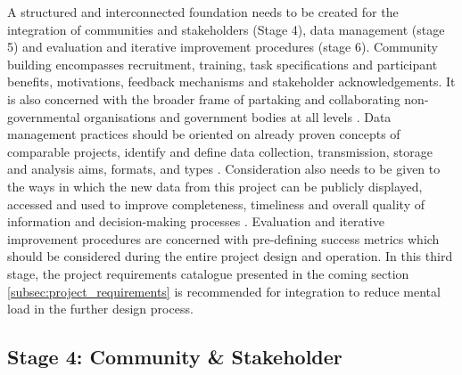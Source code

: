 A structured and interconnected foundation needs to be created for the integration of communities and stakeholders (Stage 4), data management (stage 5) and evaluation and iterative improvement procedures (stage 6). Community building encompasses recruitment, training, task specifications and participant benefits, motivations, feedback mechanisms and stakeholder acknowledgements. It is also concerned with the broader frame of partaking and collaborating non-governmental organisations and government bodies at all levels \autocite{conradReviewCitizenScience2011}. Data management practices should be oriented on already proven concepts of comparable projects, identify and define data collection, transmission, storage and analysis aims, formats, and types \autocite{fraislCitizenScienceEnvironmental2022,gualazziniEWEAEarlyWarning2021,ifrcCommunityBasedSurveillanceGuiding2017}. Consideration also needs to be given to the ways in which the new data from this project can be publicly displayed, accessed and used to improve completeness, timeliness and overall quality of information and decision-making processes \autocite{conradMeaningfulCommunityBasedEcological2006}. Evaluation and iterative improvement procedures are concerned with pre-defining success metrics which should be considered during the entire project design and operation.\newline
In this third stage, the project requirements catalogue presented in the coming section \ref*{subsec:project_requirements} is recommended for integration to reduce mental load in the further design process.

\subsection{Stage 4: Community \& Stakeholder}\label{subsec:stage4_design}

